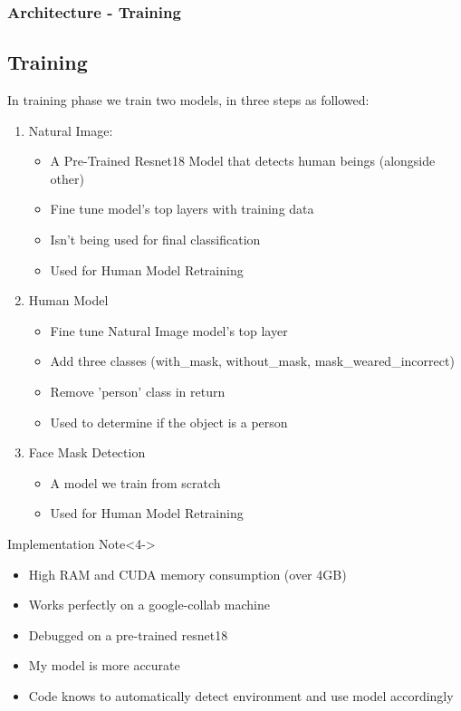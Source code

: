 \begin{frame}
    \frametitle{Architecture - Training}
    \subsection{Training}
    In training phase we train two models, in three steps as followed:
    \begin{enumerate}
        \item<1-> \label{NI} Natural Image:
        \begin{itemize}
            \item A Pre-Trained Resnet18 Model that detects human beings (alongside other)
            \item Fine tune model's top layers with training data
            \item Isn't being used for final classification
            \item Used for Human Model Retraining
        \end{itemize}
        \item<2-> Human Model
        \begin{itemize}
            \item Fine tune Natural Image model's top layer
            \item Add three classes (with\_mask, without\_mask, mask\_weared\_incorrect)
            \item Remove 'person' class in return
            \item Used to determine if the object is a person
        \end{itemize}
        \item<3-> Face Mask Detection
        \begin{itemize}
            \item A model we train from scratch
            \item Used for Human Model Retraining
        \end{itemize}
    \end{enumerate}

    \begin{block}{Implementation Note}<4->
        \begin{itemize}
            \item High RAM and CUDA memory consumption (over 4GB)
            \item Works perfectly on a google-collab machine
            \item Debugged on a pre-trained resnet18
            \item My model is more accurate
            \item Code knows to automatically detect environment and use model accordingly
        \end{itemize}
    \end{block}
\end{frame}


